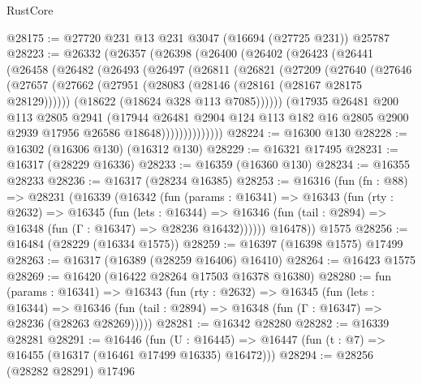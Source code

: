 \begin{lexlean}{RustCore}
\begin{coremodule}
@28175 := @27720 @231 @13 @231 @3047 (@16694 (@27725 @231)) @25787
@28223 := @26332
    (@26357
      (@26398
        (@26400
          (@26402
            (@26423
              (@26441
                (@26458
                  (@26482
                    (@26493
                      (@26497
                        (@26811
                          (@26821
                            (@27209
                              (@27640
                                (@27646
                                  (@27657
                                    (@27662
                                      (@27951 (@28083 (@28146 (@28161 (@28167 @28175 @28129))))))
                                    (@18622 (@18624 @328 @113 @7085))))))
                            (@17935
                              @26481
                              @200
                              @113
                              @2805
                              @2941
                              (@17944
                                @26481
                                @2904
                                @124
                                @113
                                @182
                                @16
                                @2805
                                @2900
                                @2939
                                @17956
                                @26586
                                @18648))))))))))))))
@28224 := @16300 @130
@28228 := @16302 (@16306 @130) (@16312 @130)
@28229 := @16321 @17495
@28231 := @16317 (@28229 @16336)
@28233 := @16359 (@16360 @130)
@28234 := @16355 @28233
@28236 := @16317 (@28234 @16385)
@28253 := @16316
    (fun (fn : @88) =>
    @28231
      (@16339
        (@16342
          (fun (params : @16341) =>
          @16343
            (fun (rty : @2632) =>
            @16345
              (fun (lets : @16344) =>
              @16346 (fun (tail : @2894) => @16348 (fun (Γ : @16347) => @28236 @16432))))))
        @16478))
    @1575
@28256 := @16484 (@28229 (@16334 @1575))
@28259 := @16397 (@16398 @1575) @17499
@28263 := @16317 (@16389 (@28259 @16406) @16410)
@28264 := @16423 @1575
@28269 := @16420 (@16422 @28264 @17503 @16378 @16380)
@28280 := fun (params : @16341) =>
  @16343
    (fun (rty : @2632) =>
    @16345
      (fun (lets : @16344) =>
      @16346 (fun (tail : @2894) => @16348 (fun (Γ : @16347) => @28236 (@28263 @28269)))))
@28281 := @16342 @28280
@28282 := @16339 @28281
@28291 := @16446
    (fun (U : @16445) => @16447 (fun (t : @7) => @16455 (@16317 (@16461 @17499 @16335) @16472)))
@28294 := @28256 (@28282 @28291) @17496

\end{coremodule}
\end{lexlean}
